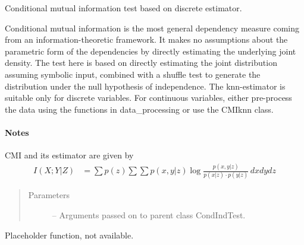 \documentclass[letterpaper,10pt,english]{sphinxmanual}
\begin{document}
\begin{fulllineitems}
\label{\detokenize{index:tigramite.independence_tests.CMIsymb}}
Conditional mutual information test based on discrete estimator.

Conditional mutual information is the most general dependency measure
coming from an information-theoretic framework. It makes no assumptions
about the parametric form of the dependencies by directly estimating the
underlying joint density. The test here is based on directly estimating
the joint distribution assuming symbolic input, combined with a
shuffle test to generate  the distribution under the null hypothesis of
independence. The knn-estimator is suitable only for discrete variables.
For continuous variables, either pre-process the data using the functions
in data\_processing or use the CMIknn class.
\paragraph{Notes}

CMI and its estimator are given by
\begin{equation*}
\begin{split}I(X;Y|Z) &= \sum p(z)  \sum \sum  p(x,y|z) \log
\frac{ p(x,y |z)}{p(x|z)\cdot p(y |z)} \,dx dy dz\end{split}
\end{equation*}\begin{quote}\begin{description}
\item[{Parameters}] \leavevmode
{} -- Arguments passed on to parent class CondIndTest.

\end{description}\end{quote}

\begin{fulllineitems}
\label{\detokenize{index:tigramite.independence_tests.CMIsymb.get_analytic_confidence}}
Placeholder function, not available.

\end{fulllineitems}



\end{fulllineitems}
\end{document}
